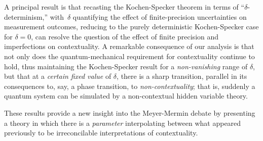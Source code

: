 \documentclass[english,reprint, aps, prl,superscriptaddress, showpacs,
showkeys, longbibliography, amsmath, amssymb, floatfix]{revtex4-1}
\theoremstyle{plain}
\theoremstyle{definition}
\newcommand{\yutsung}[1]{\begin{framed}\begin{minipage}{0.9\linewidth}\color{purple}{Yu-Tsung says: #1}\end{minipage}\end{framed}}
\begin{document}
A principal result is that recasting the Kochen-Specker theorem in
terms of ``$\delta$-determinism,'' with~$\delta$ quantifying the
effect of finite-precision uncertainties on measurement outcomes,
reducing to the purely deterministic Kochen-Specker case for
$\delta=0$, can resolve the question of the effect of finite precision
and imperfections on contextuality.  A remarkable consequence of our
analysis is that not only does the quantum-mechanical requirement for
contextuality continue to hold, thus maintaining the Kochen-Specker
result for a \emph{non-vanishing} range of $\delta$, but that at a
\emph{certain fixed value} of $\delta$, there is a sharp transition,
parallel in its consequences to, say, a phase transition, to
\emph{non-contextuality}; that is, suddenly a quantum system can be
simulated by a non-contextual hidden variable theory.
\yutsung{Rewrite to match the interpretation of the Kochen-Specker section.}
These results provide a new insight into the Meyer-Mermin debate by
presenting a theory in which there is a \emph{parameter} interpolating
between what appeared previously to be irreconcilable interpretations
of contextuality.
\end{document}
